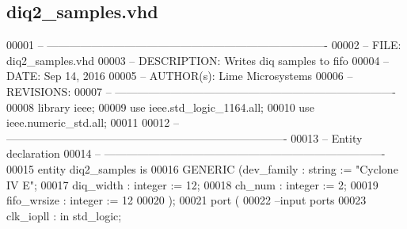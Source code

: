 \subsection{diq2\+\_\+samples.\+vhd}
\label{diq2__samples_8vhd_source}

\begin{DoxyCode}
00001 \textcolor{keyword}{-- ---------------------------------------------------------------------------- }
00002 \textcolor{keyword}{-- FILE:    diq2\_samples.vhd}
00003 \textcolor{keyword}{-- DESCRIPTION: Writes diq samples to fifo }
00004 \textcolor{keyword}{-- DATE:    Sep 14, 2016}
00005 \textcolor{keyword}{-- AUTHOR(s):   Lime Microsystems}
00006 \textcolor{keyword}{-- REVISIONS:}
00007 \textcolor{keyword}{-- ---------------------------------------------------------------------------- }
00008 \textcolor{vhdlkeyword}{library }\textcolor{keywordflow}{ieee};
00009 \textcolor{vhdlkeyword}{use }ieee.std\_logic\_1164.\textcolor{keywordflow}{all};
00010 \textcolor{vhdlkeyword}{use }ieee.numeric\_std.\textcolor{keywordflow}{all};
00011 
00012 \textcolor{keyword}{-- ----------------------------------------------------------------------------}
00013 \textcolor{keyword}{-- Entity declaration}
00014 \textcolor{keyword}{-- ----------------------------------------------------------------------------}
00015 \textcolor{keywordflow}{entity }diq2_samples \textcolor{keywordflow}{is}
00016     \textcolor{keywordflow}{GENERIC} \textcolor{vhdlchar}{(}\textcolor{vhdlchar}{dev_family}     \textcolor{vhdlchar}{:} \textcolor{comment}{string}        \textcolor{vhdlchar}{:=} \textcolor{keyword}{"Cyclone IV E"};
00017                 \textcolor{vhdlchar}{diq_width}       \textcolor{vhdlchar}{:} \textcolor{comment}{integer}   \textcolor{vhdlchar}{:=} \textcolor{vhdllogic}{}\textcolor{vhdllogic}{12};
00018                 \textcolor{vhdlchar}{ch_num}          \textcolor{vhdlchar}{:} \textcolor{comment}{integer}   \textcolor{vhdlchar}{:=} \textcolor{vhdllogic}{}\textcolor{vhdllogic}{2};
00019                 \textcolor{vhdlchar}{fifo_wrsize}     \textcolor{vhdlchar}{:} \textcolor{comment}{integer}   \textcolor{vhdlchar}{:=} \textcolor{vhdllogic}{}\textcolor{vhdllogic}{12}
00020                 \textcolor{vhdlchar}{)};
00021   \textcolor{keywordflow}{port} \textcolor{vhdlchar}{(}
00022 \textcolor{keyword}{      --input ports }
00023       \textcolor{vhdlchar}{clk_iopll}     \textcolor{vhdlchar}{:} \textcolor{keywordflow}{in} \textcolor{comment}{std\_logic};

\end{DoxyCode}

